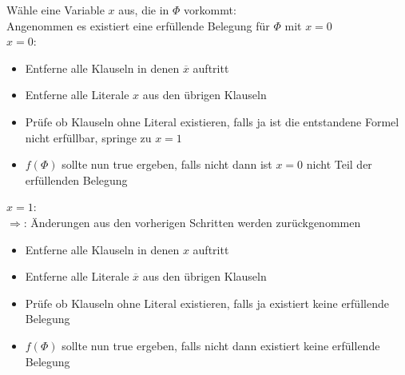 \documentclass[a4paper,11pt,twoside]{article}
\begin{document}
Wähle eine Variable $x$ aus, die in $\Phi$ vorkommt:\\
Angenommen es existiert eine erfüllende Belegung für $\Phi$ mit $x=0$\\
$x=0$:\begin{itemize}
\item Entferne alle Klauseln in denen $\overline x$ auftritt
\item Entferne alle Literale $x$ aus den übrigen Klauseln
\item Prüfe ob Klauseln ohne Literal existieren, falls ja ist die entstandene Formel nicht erfüllbar, springe zu $x=1$
\item $f(\Phi)$ sollte nun true ergeben, falls nicht dann ist $x=0$ nicht Teil der erfüllenden Belegung
\end{itemize}
$x=1$:\\
$\Rightarrow$: Änderungen aus den vorherigen Schritten werden zurückgenommen
\begin{itemize}
\item Entferne alle Klauseln in denen $x$ auftritt
\item Entferne alle Literale $\overline x$ aus den übrigen Klauseln
\item Prüfe ob Klauseln ohne Literal existieren, falls ja existiert keine erfüllende Belegung
\item $f(\Phi)$ sollte nun true ergeben, falls nicht dann existiert keine erfüllende Belegung
\end{itemize} 
\end{document}
